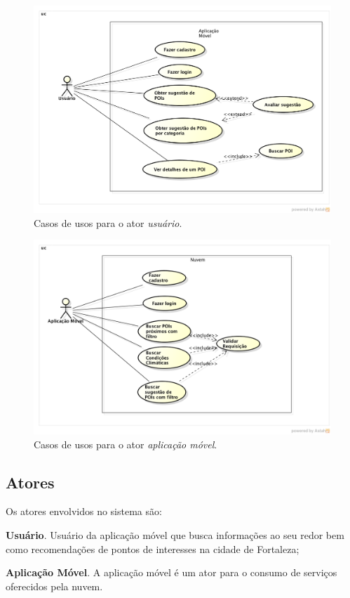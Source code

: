 \documentclass[11pt,a4paper,oneside]{article}
\begin{document}
\begin{figure}[htb]
\centering
\includegraphics[scale=0.45]{../casos-de-usos/casos-de-usos-usuario-app.png}
\caption{Casos de usos para o ator \emph{usuário}.}
\label{fig:casos-de-usos-app-servidor}
\end{figure}

\begin{figure}[htb]
\centering
\includegraphics[scale=0.45]{../casos-de-usos/casos-de-usos-app-servidor.png}
\caption{Casos de usos para o ator \emph{aplicação móvel}.}
\label{fig:casos-de-usos-app-servidor}
\end{figure}

\subsection{Atores}
Os atores envolvidos no sistema são:
\begin{description}
\item \textbf{Usuário}. Usuário da aplicação móvel que busca informações ao seu redor bem como recomendações de pontos de interesses na cidade de Fortaleza;
\item \textbf{Aplicação Móvel}. A aplicação móvel é um ator para o consumo de serviços oferecidos pela nuvem.
\end{description}
\end{document}
